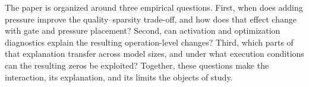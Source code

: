 The paper is organized around three empirical questions. First, when does
adding pressure improve the quality--sparsity trade-off, and how does that
effect change with gate and pressure placement? Second, can activation and
optimization diagnostics explain the resulting operation-level changes?
Third, which parts of that explanation transfer across model sizes, and under
what execution conditions can the resulting zeros be exploited? Together,
these questions make the interaction, its explanation, and its limits the
objects of study.

